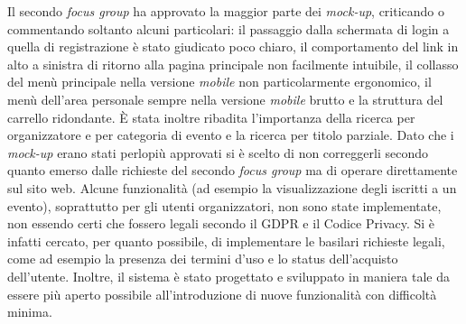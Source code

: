 \documentclass[a4paper, 12pt]{report}
\begin{document}
Il secondo \textit{focus group} ha approvato la maggior parte dei \textit{mock-up}, criticando o commentando soltanto alcuni particolari: il passaggio dalla schermata di login a quella di registrazione è stato giudicato poco chiaro, il comportamento del link in alto a sinistra di ritorno alla pagina principale non facilmente intuibile, il collasso del menù principale nella versione \textit{mobile} non particolarmente ergonomico, il menù dell'area personale sempre nella versione \textit{mobile} brutto e la struttura del carrello ridondante. È stata inoltre ribadita l’importanza della ricerca per organizzatore e per categoria di evento e la ricerca per titolo parziale.\newline\newline
Dato che i \textit{mock-up} erano stati perlopiù approvati si è scelto di non correggerli secondo quanto emerso dalle richieste del secondo \textit{focus group} ma di operare direttamente sul sito web.
Alcune funzionalità (ad esempio la visualizzazione degli iscritti a un evento), soprattutto per gli utenti organizzatori, non sono state implementate, non essendo certi che fossero legali secondo il GDPR e il Codice Privacy. Si è infatti cercato, per quanto possibile, di implementare le basilari richieste legali,
come ad esempio la presenza dei termini d'uso e lo status dell'acquisto dell'utente. Inoltre, il sistema è stato progettato e sviluppato in maniera tale da essere più aperto possibile all'introduzione di nuove funzionalità con difficoltà minima.
\end{document}
